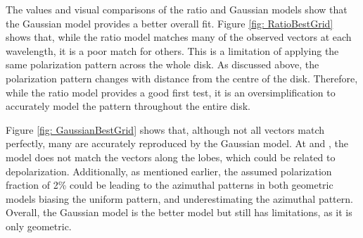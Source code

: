 
The \chired values and visual comparisons of the ratio and Gaussian models show that the Gaussian model provides a better overall fit. Figure \ref{fig: RatioBestGrid} shows that, while the ratio model matches many of the observed vectors at each wavelength, it is a poor match for others. This is a limitation of applying the same polarization pattern across the whole disk. As discussed above, the polarization pattern changes with distance from the centre of the disk. Therefore, while the ratio model provides a good first test, it is an oversimplification to accurately model the pattern throughout the entire disk. 


Figure \ref{fig: GaussianBestGrid} shows that, although not all vectors match perfectly, many are accurately reproduced by the Gaussian model. At \bsix and \bsevenNS, the model does not match the vectors along the lobes, which could be related to depolarization. Additionally, as mentioned earlier, the assumed polarization fraction of 2\% could be leading to the azimuthal patterns in both geometric models biasing the uniform pattern, and underestimating the azimuthal pattern. Overall, the Gaussian model is the better model but still has limitations, as it is only geometric. 
